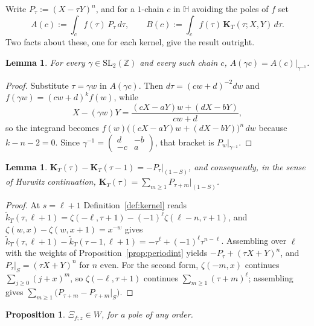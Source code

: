 \documentclass[11pt]{article}
\newtheorem{lemma}[theorem]{Lemma}
\newtheorem{proposition}[theorem]{Proposition}
\newcommand{\HH}{\mathbb{H}}
\newcommand{\ZZ}{\mathbb{Z}}
\newcommand{\SLZ}{\mathrm{SL}_2(\ZZ)}
\newcommand{\tk}{\widetilde{k}_T}
\begin{document}
Write $P_\tau:=(X-\tau Y)^n$, and for a $1$-chain $c$ in $\HH$ avoiding the poles of $f$ set
\begin{equation}\label{eq:resAB}
A(c):=\int_c f(\tau)\,P_\tau\,d\tau,\qquad B(c):=\int_c f(\tau)\,\mathbf K_T(\tau;X,Y)\,d\tau .
\end{equation}
Two facts about these, one for each kernel, give the result outright.

\begin{lemma}\label{lem:resequiv}
For every $\gamma\in\SLZ$ and every such chain $c$, $A(\gamma c)=A(c)|_{\gamma^{-1}}$.
\end{lemma}

\begin{proof}
Substitute $\tau=\gamma w$ in $A(\gamma c)$. Then $d\tau=(cw+d)^{-2}dw$ and $f(\gamma w)=(cw+d)^kf(w)$,
while
\begin{equation}
X-(\gamma w)Y=\frac{(cX-aY)w+(dX-bY)}{cw+d},
\end{equation}
so the integrand becomes $f(w)\big((cX-aY)w+(dX-bY)\big)^n\,dw$ because $k-n-2=0$. Since
$\gamma^{-1}=\left(\begin{smallmatrix}d&-b\\-c&a\end{smallmatrix}\right)$, that bracket is
$P_w|_{\gamma^{-1}}$.
\end{proof}

\begin{lemma}\label{lem:resorbit}
$\mathbf K_T(\tau)-\mathbf K_T(\tau-1)=-P_\tau|_{(1-S)}$, and consequently, in the sense of Hurwitz
continuation, $\mathbf K_T(\tau)=\sum_{m\ge1}P_{\tau+m}\big|_{(1-S)}$.
\end{lemma}

\begin{proof}
At $s=\ell+1$ Definition~\ref{def:kernel} reads
$\tk(\tau,\ell+1)=\zeta(-\ell,\tau+1)-(-1)^\ell\zeta(\ell-n,\tau+1)$, and
$\zeta(w,x)-\zeta(w,x+1)=x^{-w}$ gives
$\tk(\tau,\ell+1)-\tk(\tau-1,\ell+1)=-\tau^\ell+(-1)^\ell\tau^{n-\ell}$. Assembling over $\ell$ with
the weights of Proposition~\ref{prop:periodint} yields $-P_\tau+(\tau X+Y)^n$, and
$P_\tau|_S=(\tau X+Y)^n$ for $n$ even. For the second form, $\zeta(-m,x)$ continues
$\sum_{j\ge0}(j+x)^m$, so $\zeta(-\ell,\tau+1)$ continues $\sum_{m\ge1}(\tau+m)^\ell$; assembling
gives $\sum_{m\ge1}\big(P_{\tau+m}-P_{\tau+m}|_S\big)$.
\end{proof}

\begin{proposition}\label{prop:respolyW}
$\Xi_{f;z} \in W$, for a pole of any order.
\end{proposition}
\end{document}
